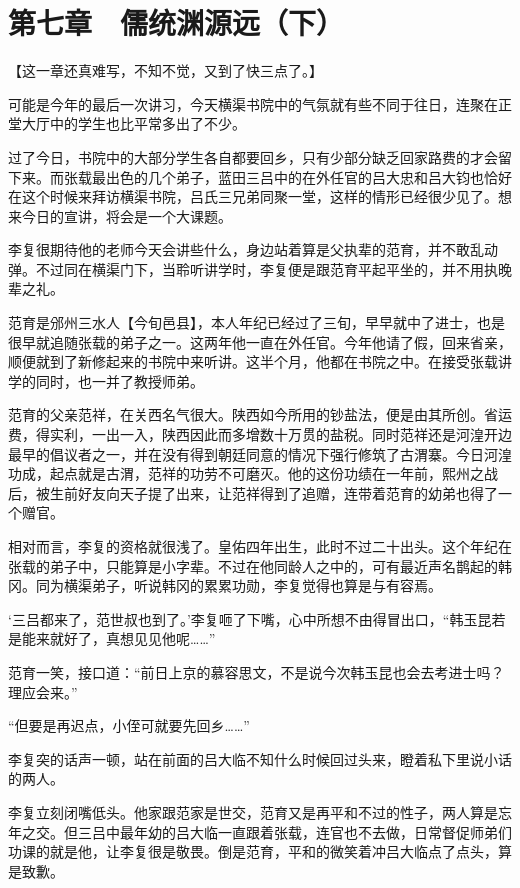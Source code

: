 \section{第七章　儒统渊源远（下）}

【这一章还真难写，不知不觉，又到了快三点了。】

可能是今年的最后一次讲习，今天横渠书院中的气氛就有些不同于往日，连聚在正堂大厅中的学生也比平常多出了不少。

过了今日，书院中的大部分学生各自都要回乡，只有少部分缺乏回家路费的才会留下来。而张载最出色的几个弟子，蓝田三吕中的在外任官的吕大忠和吕大钧也恰好在这个时候来拜访横渠书院，吕氏三兄弟同聚一堂，这样的情形已经很少见了。想来今日的宣讲，将会是一个大课题。

李复很期待他的老师今天会讲些什么，身边站着算是父执辈的范育，并不敢乱动弹。不过同在横渠门下，当聆听讲学时，李复便是跟范育平起平坐的，并不用执晚辈之礼。

范育是邠州三水人【今旬邑县】，本人年纪已经过了三旬，早早就中了进士，也是很早就追随张载的弟子之一。这两年他一直在外任官。今年他请了假，回来省亲，顺便就到了新修起来的书院中来听讲。这半个月，他都在书院之中。在接受张载讲学的同时，也一并了教授师弟。

范育的父亲范祥，在关西名气很大。陕西如今所用的钞盐法，便是由其所创。省运费，得实利，一出一入，陕西因此而多增数十万贯的盐税。同时范祥还是河湟开边最早的倡议者之一，并在没有得到朝廷同意的情况下强行修筑了古渭寨。今日河湟功成，起点就是古渭，范祥的功劳不可磨灭。他的这份功绩在一年前，熙州之战后，被生前好友向天子提了出来，让范祥得到了追赠，连带着范育的幼弟也得了一个赠官。

相对而言，李复的资格就很浅了。皇佑四年出生，此时不过二十出头。这个年纪在张载的弟子中，只能算是小字辈。不过在他同龄人之中的，可有最近声名鹊起的韩冈。同为横渠弟子，听说韩冈的累累功勋，李复觉得也算是与有容焉。

‘三吕都来了，范世叔也到了。’李复咂了下嘴，心中所想不由得冒出口，“韩玉昆若是能来就好了，真想见见他呢……”

范育一笑，接口道：“前日上京的慕容思文，不是说今次韩玉昆也会去考进士吗？理应会来。”

“但要是再迟点，小侄可就要先回乡……”

李复突的话声一顿，站在前面的吕大临不知什么时候回过头来，瞪着私下里说小话的两人。

李复立刻闭嘴低头。他家跟范家是世交，范育又是再平和不过的性子，两人算是忘年之交。但三吕中最年幼的吕大临一直跟着张载，连官也不去做，日常督促师弟们功课的就是他，让李复很是敬畏。倒是范育，平和的微笑着冲吕大临点了点头，算是致歉。

